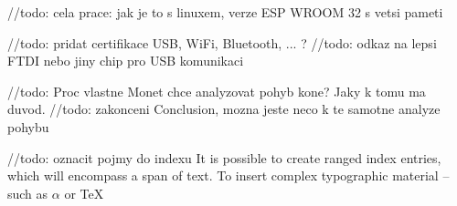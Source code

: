 \documentclass[
  digital, %
  table,   %
  lof,     %
  lot,     %
]{fithesis3}
\begin{document}












//todo: cela prace: jak je to s linuxem, verze ESP WROOM 32 s vetsi pameti

//todo: pridat certifikace USB, WiFi, Bluetooth, ... ?
//todo: odkaz na lepsi FTDI nebo jiny chip pro USB komunikaci

//todo: Proc vlastne Monet chce analyzovat pohyb kone? Jaky k tomu ma duvod.
//todo: zakonceni Conclusion, mozna jeste neco k te samotne analyze pohybu

//todo: oznacit pojmy do indexu
It is possible to create ranged index
entries, which will encompass a span of text.
To insert complex typographic material -- such as $\alpha$
 or \TeX{}  

\printbibliography[heading=bibintoc] %

\makeatletter\thesis@blocks@clear\makeatother
{}
\printindex

\appendix

\end{document}
